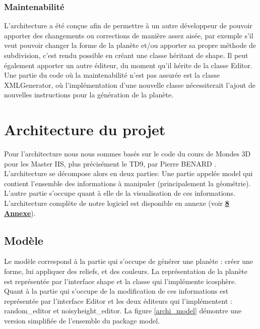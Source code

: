 \documentclass[a4paper]{article}
\begin{document}
\subsubsection{Maintenabilité}
L'architecture a été conçue afin de permettre à un autre développeur de pouvoir apporter des changements ou corrections de manière assez aisée, par exemple s'il veut pouvoir changer la forme de la planète et/ou apporter sa propre méthode de subdivision, c'est rendu possible en créant une classe héritant de shape.
Il peut également apporter un autre éditeur, du moment qu'il hérite de la classe Editor.
Une partie du code où la maintenabilité n'est pas assurée est la classe XMLGenerator, où l'implémentation d'une nouvelle classe nécessiterait l'ajout de nouvelles instructions pour la génération de la planète.


\newpage 
\section{Architecture du projet}


Pour l'architecture nous nous sommes basés sur le code du cours de Mondes 3D pour les Master IIS, plus précisément le TD9, par Pierre BENARD \cite{TD_3D}. L'architecture se décompose alors en deux parties: Une partie appelée model qui contient l'ensemble des informations à manipuler (principalement la géométrie). L'autre partie s'occupe quant à elle de la visualisation de ces informations. L'architecture complète de notre logiciel est disponible en annexe (voir \hyperref[archiComplete]{\textbf{8 Annexe}}). 
\\


\subsection{Modèle}
Le modèle correspond à la partie qui s'occupe de générer une planète : créer une forme, lui appliquer des reliefs, et des couleurs. La représentation de la planète est représentée par l'interface shape et la classe qui l'implémente icosphère. Quant à la partie qui s'occupe de la modification de ces informations est représentée par l'interface Editor et les deux éditeurs qui l'implémentent : random\_editor et noisyheight\_editor. La figure \ref{archi_model} démontre une version simplifiée de l'ensemble du package model.\\
\end{document}
